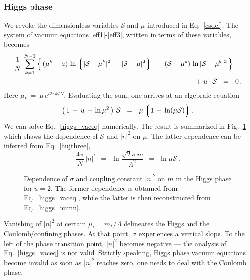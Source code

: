 \documentclass[epsfig,12pt]{article}
\def\beq{\begin{equation}}
\def\eeq{\end{equation}}
\newcommand{\cs}{{\mathcal S}}
\def\beq{\begin{equation}}
\def\eeq{\end{equation}}
\newcommand{\lgr}{\left\lgroup}
\newcommand{\rgr}{\right\rgroup}
\begin{document}
{\subsubsection{Higgs phase}
\label{subsnumhiggs}

We revoke the dimensionless variables $ \cs $ and $ \mu $ introduced in Eq.~\eqref{csdef}.
The system of vacuum equations \eqref{eff1}-\eqref{eff3}, written in terms of these variables, becomes
\begin{align}
%
\notag
	\frac{1}{N}\,\sum_{k=1}^{N-1}  \left\{\,  (\mu^k - \mu)\, 
			                          \ln \lgr |\cs - \mu^k |^2  \,-\, |\cs - \mu |^2 \rgr 
                         			   ~+~ (\cs - \mu^k)\, \ln |\cs - \mu^k | ^2 \,\right\} ~+ \\
%
                              ~+~ u\cdot \cs ~~=~~ 0\,.
\end{align}
Here $ \mu_k ~=~ \mu\, e^{i2\pi k / N} $.
Evaluating the sum, one arrives at an algebraic equation
\beq
\label{higgs_vaceq}
	\left(\, 1 \,+\, u \,+\, \ln \mu^2 \,\right)\, \cs  ~~=~~ \mu \lgr 1 \,+\, \ln(\mu \cs) \rgr .
\eeq
We can solve Eq.~\eqref{higgs_vaceq} numerically. 
The result is summarized in Fig.~\ref{fig:numsignm} which shows the dependence of $ \cs $ and $ |n|^2 $ on $\mu$.
The latter dependence can be inferred from Eq.~\eqref{hujthree},
\beq
\label{higgs_numn}
	\frac{4\pi}{N}\, |n|^2 ~~=~~ \ln \frac{\sqrt{2}\sigma\, m}{\Lambda^2}
		~~=~~ \ln \mu\cs \,.
\eeq 

\begin{figure}
\epsfxsize=11cm
\centerline{}
\caption{\small Dependence of $\sigma$ and coupling constant $|n|^2$ on $m$ in the Higgs phase for $u = 2$.
The former dependence is obtained from Eq.~\eqref{higgs_vaceq}, while the latter is then reconstructed from
Eq.~\eqref{higgs_numn}.}
\label{fig:numsignm}
\end{figure}
Vanishing of $ |n|^2 $ at certain $ \mu_* = m_*/\Lambda $ delineates the Higgs and the Coulomb/confining 
phases.
At that point, $\sigma$ experiences a vertical slope. 
To the left of the phase transition point, $ |n|^2 $ becomes negative --- 
the analysis of Eq.~\eqref{higgs_vaceq} is not valid.
Strictly speaking, Higgs phase vacuum equations become invalid as soon as $|n|^2$ reaches zero,
one needs to deal with the Coulomb phase. 

}
\end{document}
